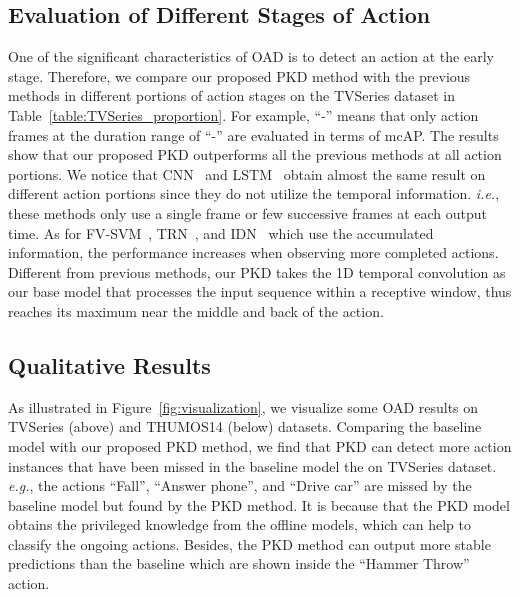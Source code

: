 \documentclass[final]{cvpr}
\begin{document}
\subsection{Evaluation of Different Stages of Action}

One of the significant characteristics of OAD is to detect an action at the early stage. Therefore, we compare our proposed PKD method with the previous methods in different portions of action stages on the TVSeries dataset in Table~\ref{table:TVSeries_proportion}. For example, ``-'' means that only action frames at the duration range of ``-'' are evaluated in terms of mcAP. The results show that our proposed PKD outperforms all the previous methods at all action portions. We notice that CNN~\cite{geest2016online} and LSTM~\cite{geest2016online} obtain almost the same result on different action portions since they do not utilize the temporal information. \emph{i.e.}, these methods only use a single frame or few successive frames at each output time. As for FV-SVM~\cite{geest2016online}, TRN~\cite{xu2019trn}, and IDN~\cite{eun2020learning} which use the accumulated information, the performance increases when observing more completed actions. Different from previous methods, our PKD takes the 1D temporal convolution as our base model that processes the input sequence within a receptive window, thus reaches its maximum  near the middle and back of the action.



\subsection{Qualitative Results}

As illustrated in Figure~\ref{fig:visualization}, we visualize some OAD results on TVSeries (above) and THUMOS14 (below) datasets. Comparing the baseline model  with our proposed PKD method, we find that PKD can detect more action instances that have been missed in the baseline model the on TVSeries dataset. \emph{e.g.}, the actions ``Fall'', ``Answer phone'', and ``Drive car'' are missed by the baseline model but found by the PKD method. It is because that the PKD model obtains the privileged knowledge from the offline models, which can help to classify the ongoing actions. Besides, the PKD method can output more stable predictions than the baseline which are shown inside the ``Hammer Throw'' action.
\end{document}

